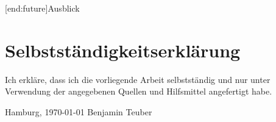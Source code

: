 \documentclass[11pt, a4paper, bibgerm]{scrbook}
\newcommand\lsection{}
\begin{document}
\lsection[end:future]{Ausblick}


\cleardoublepage





\listoffigures
{}

\chapter*{Selbstständigkeitserklärung}

Ich erkläre, dass ich die vorliegende Arbeit selbstständig und nur unter
Verwendung der angegebenen Quellen und Hilfsmittel angefertigt habe.
\vskip 2cm
\begin{flushright}
Hamburg, \today
\vskip 1cm
Benjamin Teuber
\end{flushright}
\end{document}
